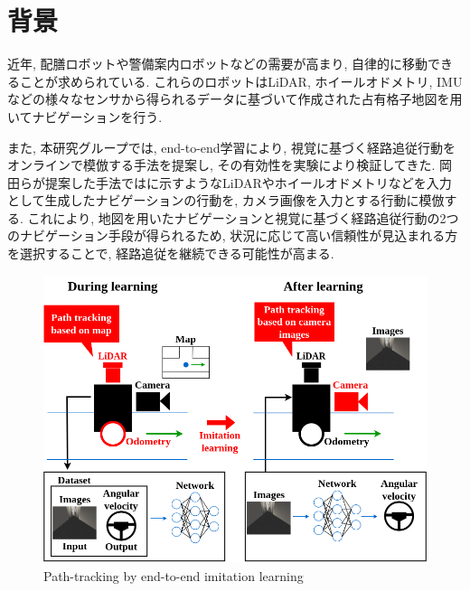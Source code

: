 
\section{背景}
近年, 配膳ロボットや警備案内ロボットなどの需要が高まり, 自律的に移動できることが求められている. これらのロボットはLiDAR, ホイールオドメトリ, IMUなどの様々なセンサから得られるデータに基づいて作成された占有格子地図を用いてナビゲーションを行う. \par また, 本研究グループでは, end-to-end学習により, 視覚に基づく経路追従行動をオンラインで模倣する手法を提案し, その有効性を実験により検証してきた. 岡田らが提案した手法ではに示すようなLiDARやホイールオドメトリなどを入力として生成したナビゲーションの行動を, カメラ画像を入力とする行動に模倣する\cite{okada-si2020}\cite{okada-si2021}. これにより, 地図を用いたナビゲーションと視覚に基づく経路追従行動の2つのナビゲーション手段が得られるため, 状況に応じて高い信頼性が見込まれる方を選択することで, 経路追従を継続できる可能性が高まる. 


\newpage
\begin{figure}[h]
     \centering
     \includegraphics[keepaspectratio, scale=0.3]
     {images/old.png}
     \caption{Path-tracking by end-to-end imitation learning}
     \label{Fig:old}
     \end{figure}

